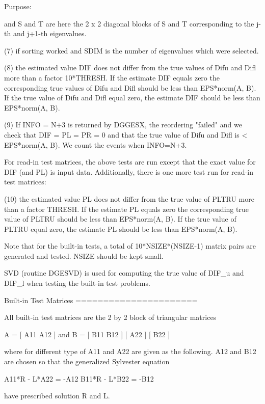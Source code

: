 \begin{DoxyParagraph}{Purpose\+: }
\begin{DoxyVerb}
           and S and T are here the 2 x 2 diagonal blocks of S and T
           corresponding to the j-th and j+1-th eigenvalues.

 (7)   if sorting worked and SDIM is the number of eigenvalues
       which were selected.

 (8)   the estimated value DIF does not differ from the true values of
       Difu and Difl more than a factor 10*THRESH. If the estimate DIF
       equals zero the corresponding true values of Difu and Difl
       should be less than EPS*norm(A, B). If the true value of Difu
       and Difl equal zero, the estimate DIF should be less than
       EPS*norm(A, B).

 (9)   If INFO = N+3 is returned by DGGESX, the reordering "failed"
       and we check that DIF = PL = PR = 0 and that the true value of
       Difu and Difl is < EPS*norm(A, B). We count the events when
       INFO=N+3.

 For read-in test matrices, the above tests are run except that the
 exact value for DIF (and PL) is input data.  Additionally, there is
 one more test run for read-in test matrices:

 (10)  the estimated value PL does not differ from the true value of
       PLTRU more than a factor THRESH. If the estimate PL equals
       zero the corresponding true value of PLTRU should be less than
       EPS*norm(A, B). If the true value of PLTRU equal zero, the
       estimate PL should be less than EPS*norm(A, B).

 Note that for the built-in tests, a total of 10*NSIZE*(NSIZE-1)
 matrix pairs are generated and tested. NSIZE should be kept small.

 SVD (routine DGESVD) is used for computing the true value of DIF_u
 and DIF_l when testing the built-in test problems.

 Built-in Test Matrices
 ======================

 All built-in test matrices are the 2 by 2 block of triangular
 matrices

          A = [ A11 A12 ]    and      B = [ B11 B12 ]
              [     A22 ]                 [     B22 ]

 where for different type of A11 and A22 are given as the following.
 A12 and B12 are chosen so that the generalized Sylvester equation

          A11*R - L*A22 = -A12
          B11*R - L*B22 = -B12

 have prescribed solution R and L.


\end{DoxyVerb}
\end{DoxyParagraph}
